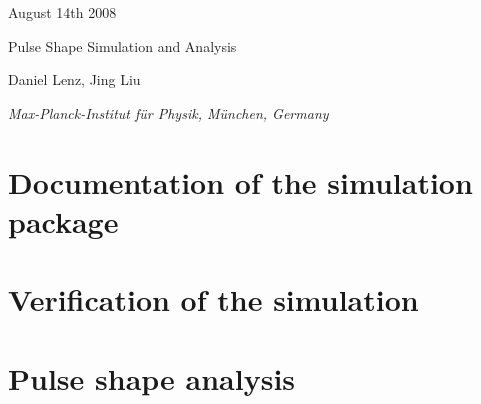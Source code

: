\documentclass[11pt, a4paper]{article}
\begin{document}

\begin{titlepage}

\begin{figure}
\end{figure} 

\hspace{10.8cm} August 14th 2008 \\ 

\begin{center}

\vspace{1.0cm}

{\Large Pulse Shape Simulation and Analysis\\ } 

\vspace{0.5cm} 


\vspace{1.0cm}

{\large 
Daniel Lenz, Jing Liu
}

\vspace{1.0cm}

{\it 
Max-Planck-Institut f\"ur Physik, M\"unchen, Germany
} 
\vspace{2.0cm} 

\end{center} 

 

\end{titlepage} 



\tableofcontents

\pagebreak 


\section{Documentation of the simulation package}
\label{sec:manual}



\section{Verification of the simulation}
\label{sec:verify}

\section{Pulse shape analysis}
\label{sec:physics}


\clearpage
 
\begin{thebibliography}{sotief}


\end{thebibliography}
\end{document}
